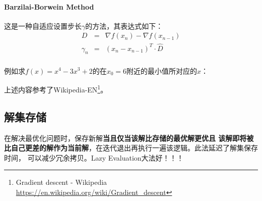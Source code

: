 \paragraph{Barzilai-Borwein Method}
这是一种自适应设置步长$\gamma$的方法，其表达式如下：
\begin{eqnarray*}
	D&=&\nabla f(x_n)-\nabla f(x_{n-1})\\
	\gamma_n&=&(x_n-x_{n-1})^T\cdot \hat{D}\\
\end{eqnarray*}

例如求$f(x)=x^4-3x^3+2$的在$x_0=6$附近的最小值所对应的$x$：



上述内容参考了Wikipedia-EN\footnote{
	Gradient descent - Wikipedia
	\url{https://en.wikipedia.org/wiki/Gradient\_descent}
}。
\subsection{解集存储}
在解决最优化问题时，保存新解{\bfseries 当且仅当该解比存储的最优解更优且
该解即将被比自己更差的解作为当前解}，在迭代退出再执行一遍该逻辑。此法延迟了解集保存时间，
可以减少冗余拷贝。Lazy Evaluation大法好！！！
